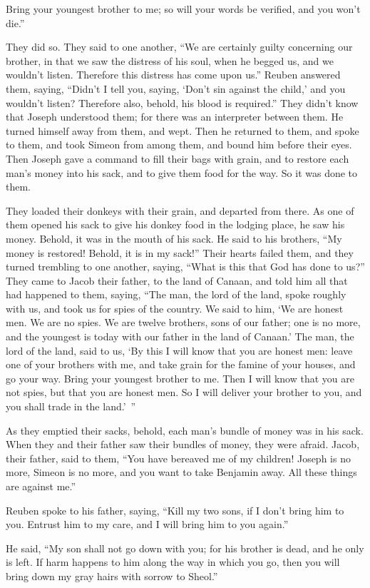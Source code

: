 {Bring your youngest brother to me; so will your words be verified, and you won’t die.”
\par }{\PP They did so.
They said to one another, “We are certainly guilty concerning our brother, in that we saw the distress of his soul, when he begged us, and we wouldn’t listen. Therefore this distress has come upon us.”
Reuben answered them, saying, “Didn’t I tell you, saying, ‘Don’t sin against the child,’ and you wouldn’t listen? Therefore also, behold, his blood is required.”
They didn’t know that Joseph understood them; for there was an interpreter between them.
He turned himself away from them, and wept. Then he returned to them, and spoke to them, and took Simeon from among them, and bound him before their eyes.
Then Joseph gave a command to fill their bags with grain, and to restore each man’s money into his sack, and to give them food for the way. So it was done to them.
\par }{\PP {}They loaded their donkeys with their grain, and departed from there.
As one of them opened his sack to give his donkey food in the lodging place, he saw his money. Behold, it was in the mouth of his sack.
He said to his brothers, “My money is restored! Behold, it is in my sack!” Their hearts failed them, and they turned trembling to one another, saying, “What is this that God has done to us?”
They came to Jacob their father, to the land of Canaan, and told him all that had happened to them, saying,
“The man, the lord of the land, spoke roughly with us, and took us for spies of the country.
We said to him, ‘We are honest men. We are no spies.
We are twelve brothers, sons of our father; one is no more, and the youngest is today with our father in the land of Canaan.’
The man, the lord of the land, said to us, ‘By this I will know that you are honest men: leave one of your brothers with me, and take grain for the famine of your houses, and go your way.
Bring your youngest brother to me. Then I will know that you are not spies, but that you are honest men. So I will deliver your brother to you, and you shall trade in the land.’ ”
\par }{\PP {}As they emptied their sacks, behold, each man’s bundle of money was in his sack. When they and their father saw their bundles of money, they were afraid.
Jacob, their father, said to them, “You have bereaved me of my children! Joseph is no more, Simeon is no more, and you want to take Benjamin away. All these things are against me.”
\par }{\PP {}Reuben spoke to his father, saying, “Kill my two sons, if I don’t bring him to you. Entrust him to my care, and I will bring him to you again.”
\par }{\PP {}He said, “My son shall not go down with you; for his brother is dead, and he only is left. If harm happens to him along the way in which you go, then you will bring down my gray hairs with sorrow to Sheol.”

}
